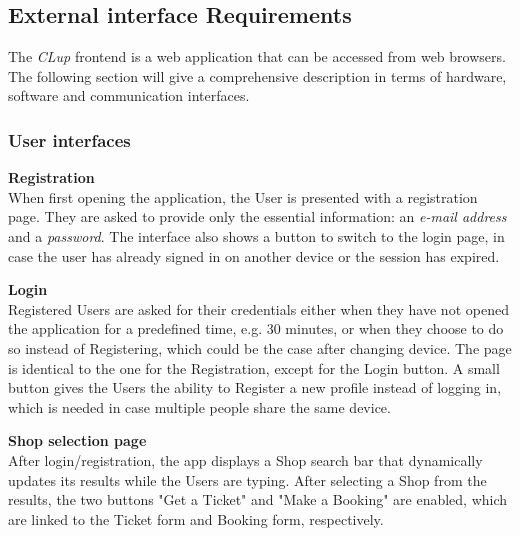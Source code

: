 \subsection{External interface Requirements}
The \emph{CLup} frontend is a web application that can be accessed from web browsers.  The following section will give a comprehensive description in terms of hardware, software and communication interfaces.

\subsubsection{User interfaces}
\textbf{Registration}\\
When first opening the application, the User is presented with a registration page. They are asked to provide only the essential information: an \emph{e-mail address} and a \emph{password}. The interface also shows a button to switch to the login page, in case the user has already signed in on another device or the session has expired.

\textbf{Login}\\
Registered Users are asked for their credentials either when they have not opened the application for a predefined time, e.g. 30 minutes, or when they choose to do so instead of Registering, which could be the case after changing device. The page is identical to the one for the Registration, except for the Login button. A small button gives the Users the ability to Register a new profile instead of logging in, which is needed in case multiple people share the same device.

\textbf{Shop selection page}\\
After login/registration, the app displays a Shop search bar that dynamically updates its results while the Users are typing. After selecting a Shop from the results, the two buttons "Get a Ticket" and "Make a Booking" are enabled, which are linked to the Ticket form and Booking form, respectively.

